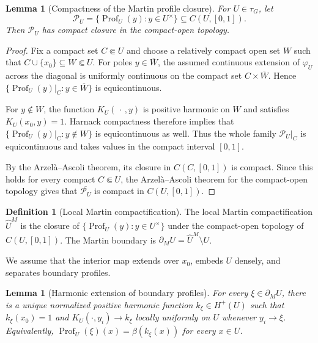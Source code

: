 \documentclass{amsart}
\newtheorem{lemma}[theorem]{Lemma}
\theoremstyle{definition}
\newtheorem{definition}{Definition}[section]
\theoremstyle{remark}
\numberwithin{equation}{section}
\begin{document}
\begin{lemma}[Compactness of the Martin profile closure]
	\label{lem:martin-profile-compactness}
	For $U\in\tau_G$, let
	$$
	\mathcal P_U
	=
	\{\operatorname{Prof}_U(y):y\in U^\times\}
	\subseteq C(U,[0,1]).
	$$
	Then $\mathcal P_U$ has compact closure in the compact-open topology.
\end{lemma}

\begin{proof}
	Fix a compact set $C\Subset U$ and choose a relatively compact open
	set $W$ such that $C\cup\{x_0\}\subseteq W\Subset U$. For poles $y\in\overline W$, the assumed continuous extension of
	$\varphi_U$ across the diagonal is uniformly continuous on the compact
	set $C\times\overline W$. Hence $\{\operatorname{Prof}_U(y)|_C:y\in\overline W\}$ is equicontinuous.
	
	For $y\notin W$, the function $K_U(\,\cdot\,,y)$ is positive harmonic
	on $W$ and satisfies $K_U(x_0,y)=1$. Harnack compactness therefore
	implies that
	$\{\operatorname{Prof}_U(y)|_C:y\notin W\}$
	is equicontinuous as well. Thus the whole family
	$\mathcal P_U|_C$ is equicontinuous and takes values in the compact
	interval $[0,1]$.
	
	By the Arzel\`a--Ascoli theorem, its closure in $C(C,[0,1])$ is compact.
	Since this holds for every compact $C\Subset U$, the Arzel\`a--Ascoli
	theorem for the compact-open topology gives that
	$\overline{\mathcal P_U}$ is compact in $C(U,[0,1])$.
\end{proof}

\begin{definition}[Local Martin compactification]
	The local Martin compactification $\widehat U^{M}$ is the closure 
	of $\{\operatorname{Prof}_{U}(y):y\in U^\times\}$ under the compact-open topology of $C(U,[0,1])$. The Martin boundary is $\partial_MU=\widehat U^M\setminus U$.
\end{definition}

We assume that the interior map extends over $x_0$, embeds $U$ densely, and separates boundary profiles.


\begin{lemma}[Harmonic extension of boundary profiles]
	\label{prop:Martin-boundary-harmonic-profile}
	For every $\xi\in\partial_MU$, there is a unique normalized positive
	harmonic function $k_\xi\in H^+(U)$ such that $k_\xi(x_0)=1$ and
	$K_{U}(\cdot,y_i)\to k_\xi$ locally uniformly on $U$ whenever
	$y_i\to\xi$. Equivalently,
	$\operatorname{Prof}_{U}(\xi)(x)=\beta(k_\xi(x))$ for every
	$x\in U$.
\end{lemma}
\end{document}
